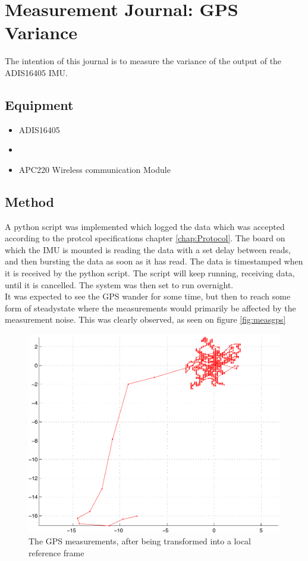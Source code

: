 \chapter{Measurement Journal: GPS Variance}
\label{chap:MeasJourGPS}
The intention of this journal is to measure the variance of the output of the ADIS16405 IMU.
\section{Equipment}
\begin{itemize}
\item ADIS16405
\item {}
\item APC220 Wireless communication Module
\end{itemize}

\section{Method}
A python script was implemented which logged the data which was accepted according to the protcol specifications chapter \ref{chap:Protocol}. The board on which the IMU is mounted is reading the data with a set delay between reads, and then bursting the data as soon as it has read. The data is timestamped when it is received by the python script. The script will keep running, receiving data, until it is cancelled. The system was then set to run overnight.\\
It was expected to see the GPS wander for some time, but then to reach some form of steadystate where the measurements would primarily be affected by the measurement noise. This was clearly observed, as seen on figure \ref{fig:measgps} \\
\begin{figure}
\includegraphics[width=\textwidth]{img/gpsmeas.pdf}
\caption{The GPS measurements, after being transformed into a local reference frame}
\end{figure}
\label{fig:measgps}

